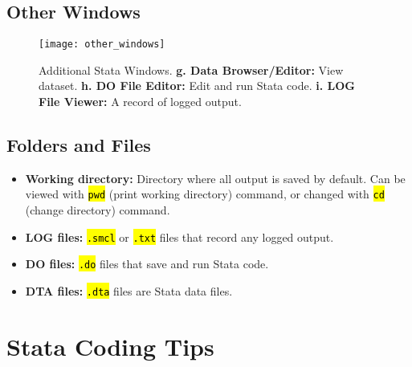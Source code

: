 \documentclass{tufte-handout}
\begin{document}
\newpage
\subsection{Other Windows}
\begin{figure}
   \texttt{[image: other\_windows]}
\caption{Additional Stata Windows.\newline
{\bf g. Data Browser/Editor:} View dataset.\newline
{\bf h. DO File Editor:} Edit and run Stata code.\newline
{\bf i. LOG File Viewer:} A record of logged output.}
\label{fig:fig2}
 \end{figure}

\subsection{Folders and Files}
\begin{itemize}
\item {\bf Working directory:} Directory where all output is saved by default. Can be viewed with {\tt \hl{pwd}} (print working directory) command, or changed with {\tt \hl{cd}} (change directory) command.
\item {\bf LOG files:} {\tt \hl{.smcl}} or {\tt \hl{.txt}} files that record any logged output.
\item {\bf DO files:} {\tt \hl{.do}} files that save and run Stata code.
\item {\bf DTA files:} {\tt \hl{.dta}} files are Stata data files.
\end{itemize}

\section{Stata Coding Tips}
\end{document}
